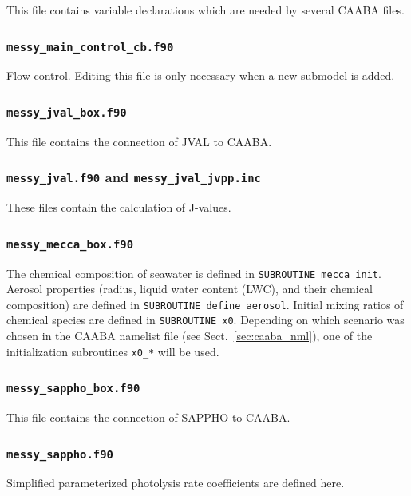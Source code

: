 \documentclass[twoside]{article}
\begin{document}
This file contains variable declarations which are needed by several
CAABA files.

\subsubsection{{\tt messy\_main\_control\_cb.f90}}

Flow control. Editing this file is only necessary when a new submodel is
added.

\subsubsection{{\tt messy\_jval\_box.f90}}

This file contains the connection of JVAL to CAABA.

\subsubsection{{\tt messy\_jval.f90} and {\tt messy\_jval\_jvpp.inc}}

These files contain the calculation of J-values.

\subsubsection{{\tt messy\_mecca\_box.f90}}

The chemical composition of seawater is defined in
\verb|SUBROUTINE mecca_init|. Aerosol properties (radius, liquid water
content (LWC), and their chemical composition) are defined in
\verb|SUBROUTINE define_aerosol|. Initial mixing ratios of chemical
species are defined in \verb|SUBROUTINE x0|. Depending on which scenario
was chosen in the CAABA namelist file (see Sect.~\ref{sec:caaba_nml}),
one of the initialization subroutines \verb|x0_*| will be used.

\subsubsection{{\tt messy\_sappho\_box.f90}}

This file contains the connection of SAPPHO to CAABA.

\subsubsection{{\tt messy\_sappho.f90}}

Simplified parameterized photolysis rate coefficients are defined here.
\end{document}
